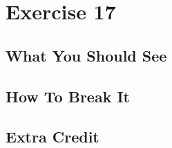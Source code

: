 \chapter{Exercise 17}


\section{What You Should See}


\section{How To Break It}


\section{Extra Credit}



